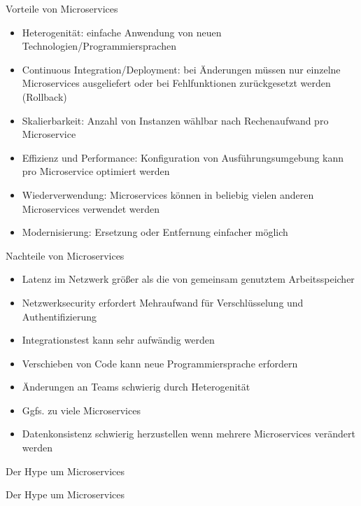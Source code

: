 \begin{frame}{Vorteile von Microservices}
	\begin{itemize}
		\item Heterogenität: einfache Anwendung von neuen Technologien/Programmiersprachen
		\item Continuous Integration/Deployment: bei Änderungen müssen nur einzelne Microservices ausgeliefert oder bei Fehlfunktionen zurückgesetzt werden (Rollback)
		\item Skalierbarkeit: Anzahl von Instanzen wählbar nach Rechenaufwand pro Microservice
		\pause
		\item Effizienz und Performance: Konfiguration von Ausführungsumgebung kann pro Microservice optimiert werden
		\item Wiederverwendung: Microservices können in beliebig vielen anderen Microservices verwendet werden
		\item Modernisierung: Ersetzung oder Entfernung einfacher möglich
	\end{itemize}
\end{frame}

\begin{frame}{Nachteile von Microservices}
	\begin{itemize}
		\item Latenz im Netzwerk größer als die von gemeinsam genutztem Arbeitsspeicher
		\item Netzwerksecurity erfordert Mehraufwand für Verschlüsselung und Authentifizierung
		\item Integrationstest kann sehr aufwändig werden
		\pause
		\item Verschieben von Code kann neue Programmiersprache erfordern
		\item Änderungen an Teams schwierig durch Heterogenität
		\item Ggfs. zu viele Microservices
		\item Datenkonsistenz schwierig herzustellen wenn mehrere Microservices verändert werden
	\end{itemize}
\end{frame}

\begin{frame}{Der Hype um Microservices}
\end{frame}

\begin{frame}{Der Hype um Microservices}
\end{frame}

